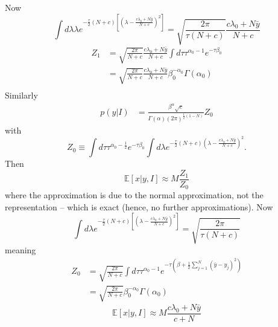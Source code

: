 Now 
\begin{equation}
	\int d\lambda \lambda e^{-\frac{\tau}{2}(N+c)[(\lambda-\frac{c\lambda_0+N\bar{y}}{N+c})^2 ]} = \sqrt{\frac{2\pi}{\tau(N+c)}}\frac{c\lambda_0+N\bar{y}}{N+c}
\end{equation}
\begin{equation}
	\begin{split}
		Z_1 &=\sqrt{\frac{2\pi}{N+c}}\frac{c\lambda_0+N\bar{y}}{N+c} \int d\tau \tau^{\alpha_0-1}e^{-\tau \beta_0}\\
		&=\sqrt{\frac{2\pi}{N+c}}\frac{c\lambda_0+N\bar{y}}{N+c}\beta_0^{-\alpha_0}\Gamma(\alpha_0) \\  
	\end{split}
\end{equation}
Similarly
\begin{equation}
	\begin{split}
		p(y|I)&=\frac{\beta^{\alpha}\sqrt{c}}{\Gamma(\alpha)(2\pi)^{\frac{1}{2}(1-N)}}Z_0
	\end{split}
\end{equation}
with
\begin{equation}
	Z_0\equiv \int d\tau \tau^{\alpha_0-\frac{1}{2}}e^{-\tau\beta_0} \int d\lambda  e^{-\frac{\tau}{2}(N+c)(\lambda-\frac{c\lambda_0+N\bar{y}}{N+c})^2}.
\end{equation}
Then
\begin{equation}
	\mathbb{E}[x|y,I]\approx M\frac{Z_1}{Z_0}
\end{equation}
where the approximation is due to the normal approximation, not the representation -- which is exact (hence, no further approximations). Now 
\begin{equation}
	\int d\lambda e^{-\frac{\tau}{2}(N+c)[(\lambda-\frac{c\lambda_0+N\bar{y}}{N+c})^2 ]} = \sqrt{\frac{2\pi}{\tau(N+c)}}
\end{equation}
meaning
\begin{equation}
	\begin{split}
		Z_0&=\sqrt{\frac{2\pi}{N+c}} \int d\tau \tau^{\alpha_0-1}e^{-\tau(\beta+\frac{1}{2}\sum_{j=1}^{N}(\bar{y}-y_j)^2)}\\
		&=\sqrt{\frac{2\pi}{N+c}}\beta_0^{-\alpha_0}\Gamma(\alpha_0)
	\end{split}
\end{equation}
\begin{equation}
	\mathbb{E}[x|y,I]\approx M\frac{c\lambda_0+N\bar{y}}{c+N}
\end{equation}



